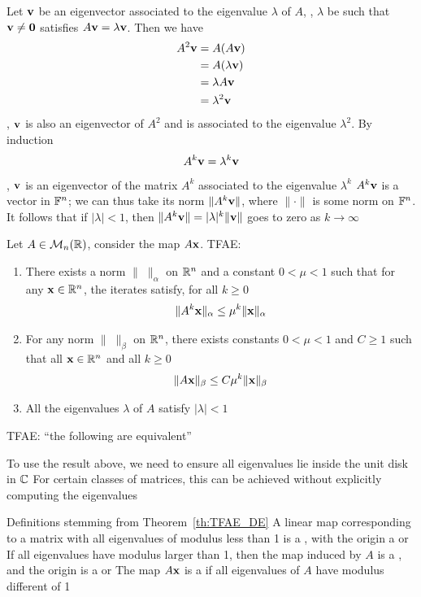 \documentclass[aspectratio=169]{beamer}
\begin{document}
\begin{frame}
Let $\mathbf{v}$ be an eigenvector associated to the eigenvalue $\lambda$ of $A$, \ie, $\lambda$ be such that $\bv\neq \b0$ satisfies $A\mathbf{v}=\lambda \mathbf{v}$. Then we have
 \begin{align*}
 A^2\mathbf{v} &= A(A\mathbf{v}) \\
 &=A(\lambda \mathbf{v}) \\
 &=\lambda A\mathbf{v} \\
 &=\lambda^2 \mathbf{v}
 \end{align*}
\ie, $\mathbf{v}$ is also an eigenvector of $A^2$ and is associated to the eigenvalue $\lambda^2$.
By induction
\[
A^k\mathbf{v}=\lambda^k \mathbf{v}
\]
\ie, $\mathbf{v}$ is an eigenvector of the matrix $A^k$ associated to the eigenvalue $\lambda^k$
\vfill
$A^k\mathbf{v}$ is a vector in $\mathbb{F}^n$; we can thus take its norm $\|A^k\mathbf{v}\|$, where $\|\cdot\|$ is some norm on $\mathbb{F}^n$. It follows that if $|\lambda|<1$, then $\|A^k\mathbf{v}\|=|\lambda|^k\|\mathbf{v}\|$ goes to zero as $k\to\infty$
\end{frame}


\begin{frame}
\begin{theorem}\label{th:TFAE_DE}
Let $A\in\mathcal{M}_n(\mathbb{R})$, consider the map $A\mathbf{x}$. TFAE:
\begin{enumerate}
\item There exists a norm $\|\;\|_\alpha$ on $\mathbb{R}^n$ and a constant $0<\mu<1$ such that for any $\mathbf{x}\in\mathbb{R}^n$, the iterates satisfy, for all $k\geq 0$
\[
\|A^k\mathbf{x}\|_\alpha\leq \mu^k\|\mathbf{x}\|_\alpha
\]
\item For any norm $\|\;\|_\beta$ on $\mathbb{R}^n$, there exists constants $0<\mu<1$ and $C\geq 1$ such that all $\mathbf{x}\in\mathbb{R}^n$ and all $k\geq 0$
\[
\|A\mathbf{x}\|_\beta\leq C\mu^k\|\mathbf{x}\|_\beta
\]
\item All the eigenvalues $\lambda$ of $A$ satisfy $|\lambda|<1$
\end{enumerate}
\end{theorem}
\vfill
TFAE: ``the following are equivalent''
\end{frame}

\begin{frame}
To use the result above, we need to ensure all eigenvalues lie inside the unit disk in $\mathbb{C}$
\vfill
For certain classes of matrices, this can be achieved without explicitly computing the eigenvalues
\end{frame}


\begin{frame}{Definitions stemming from Theorem~\ref{th:TFAE_DE}}
A linear map corresponding to a matrix with all eigenvalues of modulus less than 1 is a , with the origin a  or 
\vfill
If all eigenvalues have modulus larger than 1, then the map induced by $A$ is a , and the origin is a  or 
\vfill
The map $A\mathbf{x}$ is a  if all eigenvalues of $A$ have modulus different of 1
\end{frame}
\end{document}
